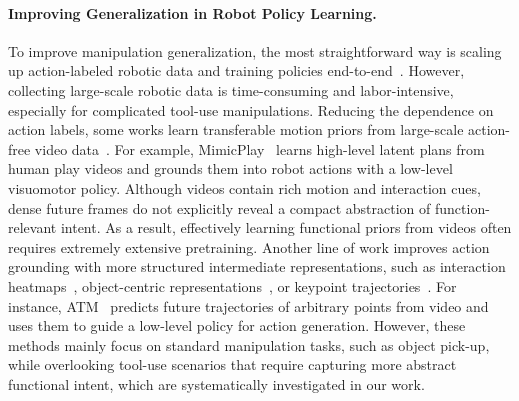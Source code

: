 \paragraph{Improving Generalization in Robot Policy Learning.}
To improve manipulation generalization, the most straightforward way is scaling up action-labeled robotic data and training policies end-to-end~\cite{zitkovich2023rt, o2024open, team2024octo, khazatsky2024droid}. 
However, collecting large-scale robotic data is time-consuming and labor-intensive, especially for complicated tool-use manipulations. 
Reducing the dependence on action labels, some works learn transferable motion priors from large-scale action-free video data~\cite{nair2023r3m, wang2023mimicplay, wu2024unleashing,ma2026dit4dit, pai2025mimic, an2026feedback, hou2026world}. 
For example, MimicPlay~\cite{wang2023mimicplay} learns high-level latent plans from human play videos and grounds them into robot actions with a low-level visuomotor policy. 
Although videos contain rich motion and interaction cues, dense future frames do not explicitly reveal a compact abstraction of function-relevant intent. As a result, effectively learning functional priors from videos often requires extremely extensive pretraining.
Another line of work improves action grounding with more structured intermediate representations, such as interaction heatmaps~\cite{mo2021where2act, bahl2023affordances, wu2025afforddp, li2026compassad}, object-centric representations~\cite{zhulearning, chen2025tool, chapin2025object}, or keypoint trajectories~\cite{gao2021kpam, huang2025rekep, turpin2021gift, wen2023any}. 
For instance, ATM~\cite{wen2023any} predicts future trajectories of arbitrary points from video and uses them to guide a low-level policy for action generation. 
However, these methods mainly focus on standard manipulation tasks, such as object pick-up, while overlooking tool-use scenarios that require capturing more abstract functional intent, which are systematically investigated in our work. 

